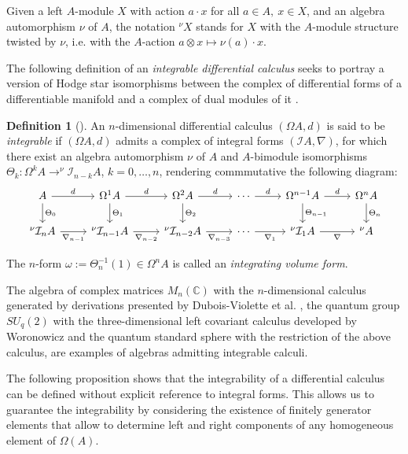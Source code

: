 \documentclass{amsart}
\theoremstyle{definition}
\newtheorem{definition}[theorem]{Definition}
\theoremstyle{remark}
\numberwithin{equation}{section}
\begin{document}
Given a left $A$-module $X$ with action $a\cdot x$ for all $a\in A,\ x \in X$, and an algebra automorphism $\nu$ of $A$, the notation $^{\nu}X$ stands for $X$ with the $A$-module structure twisted by $\nu$, i.e. with the $A$-action $a\otimes x \mapsto \nu(a)\cdot x $.

The following definition of an \textit{integrable differential calculus} seeks to portray a version of Hodge star isomorphisms between the complex of differential forms of a differentiable manifold and a complex of dual modules of it \cite[p. 112]{Brzezinski2015}. 

\begin{definition}[{\cite[Definition 2.1]{BrzezinskiSitarz2017}}]
An $n$-dimensional differential calculus $(\Omega A, d)$ is said to be {\em integrable} if $(\Omega A, d)$ admits a complex of integral forms $(\mathcal{I}A, \nabla)$, for which there exist an algebra automorphism $\nu$ of $A$ and $A$-bimodule isomorphisms \linebreak $\Theta_k: \Omega^{k} A \to ^{\nu} \mathcal{I}_{n-k}A$, $k = 0, \dotsc, n$, rendering commmutative the following diagram:
\[
\begin{tikzcd}
A \arrow{r}{d} \arrow{d}{\Theta_0} & \Omega^{1} A \arrow{d}{\Theta_1} \arrow{r}{d} & \Omega^2 A  \arrow{d}{\Theta_2} \arrow{r}{d} & \dotsb \arrow{r}{d} & \Omega^{n-1} A \arrow{d}{\Theta_{n-1}} \arrow{r}{d} & \Omega^n A  \arrow{d}{\Theta_n} \\ ^{\nu} \mathcal{I}_n A \arrow[swap]{r}{\nabla_{n-1}} & ^{\nu} \mathcal{I}_{n-1} A \arrow[swap]{r}{\nabla_{n-2}} & ^{\nu} \mathcal{I}_{n-2} A \arrow[swap]{r}{\nabla_{n-3}} & \dotsb \arrow[swap]{r}{\nabla_{1}} & ^{\nu} \mathcal{I}_{1} A \arrow[swap]{r}{\nabla} & ^{\nu} A
\end{tikzcd}
\]

The $n$-form $\omega:= \Theta_n^{-1}(1)\in \Omega^n A$ is called an {\em integrating volume form}. 
\end{definition}

The algebra of complex matrices $M_n(\mathbb{C})$ with the $n$-dimensional calculus generated by derivations presented by Dubois-Violette et al. \cite{DuboisViolette1988, DuboisVioletteKernerMadore1990}, the quantum group $SU_q(2)$ with the three-dimensional left covariant calculus developed by Woronowicz \cite{Woronowicz1987} and the quantum standard sphere with the restriction of the above calculus, are examples of algebras admitting integrable calculi. 

The following proposition shows that the integrability of a differential calculus can be defined without explicit reference to integral forms. This allows us to guarantee the integrability by considering the existence of finitely generator elements that allow to determine left and right components of any homogeneous element of $\Omega(A)$.
\end{document}
